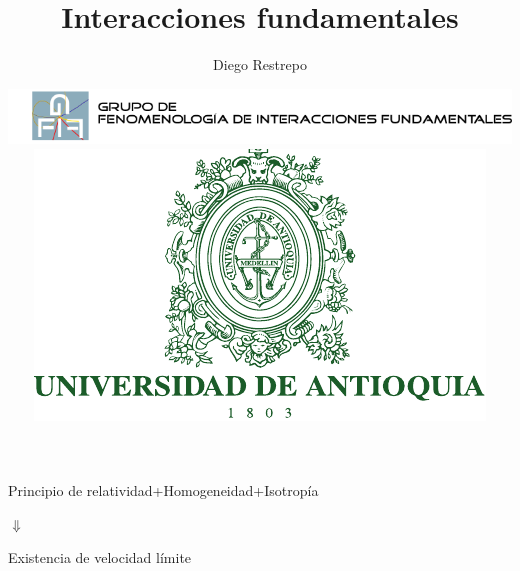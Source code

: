 \documentclass[%
xcolor=pdftex,dvipsnames,table%
]{beamer}
\title[ED] %
{Interacciones fundamentales}
\author[GFIF]%
{Diego Restrepo\inst{1} }
\institute[UdeA] %
{
  \inst{1}%
Instituto de F\'\i sica\\
Universidad de Antioquia
}
\date[] %
{
\hspace{-1.5cm}\includegraphics[scale=0.4]{gfif_logo}\hspace{1cm} \includegraphics[scale=0.3]{udea}}
\begin{document}
\begin{comentar}
\end{comentar}

\begin{frame}
  \titlepage
\end{frame}


{
\begin{frame}[plain]
\qquad

\vspace{6cm}
\begin{center}
  Principio de relatividad+Homogeneidad+Isotropía

  $\Downarrow$

    Existencia de velocidad límite
\end{center}
\end{frame}
}
\end{document}
